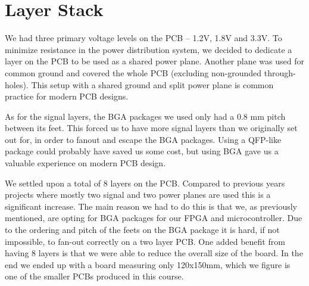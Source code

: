 \section{Layer Stack}

We had three primary voltage levels on the PCB -- 1.2V, 1.8V and 3.3V. To
minimize resistance in the power distribution system, we decided to dedicate a
layer on the PCB to be used as a shared power plane. Another plane was used for
common ground and covered the whole PCB (excluding non-grounded through-holes).
This setup with a shared ground and split power plane is common practice for
modern PCB designs.

As for the signal layers, the BGA packages we used only had a 0.8 mm pitch between
its feet. This forced us to have more signal layers than we originally set out
for, in order to fanout and escape the BGA packages. Using a QFP-like package
could probably have saved us some cost, but using BGA gave us a valuable
experience on modern PCB design.

We settled upon a total of 8 layers on the PCB. Compared to previous years projects
where mostly two signal and two power planes are used this is a significant increase.
The main reason we had to do this is that we, as previously mentioned, are opting for
BGA packages for our FPGA and microcontroller. Due to the ordering and pitch of the 
feets on the BGA package it is hard, if not impossible, to fan-out correctly on a 
two layer PCB. One added benefit from having 8 layers is that we were able to reduce
the overall size of the board. In the end we ended up with a board measuring only
120x150mm, which we figure is one of the smaller PCBs produced in this course.
